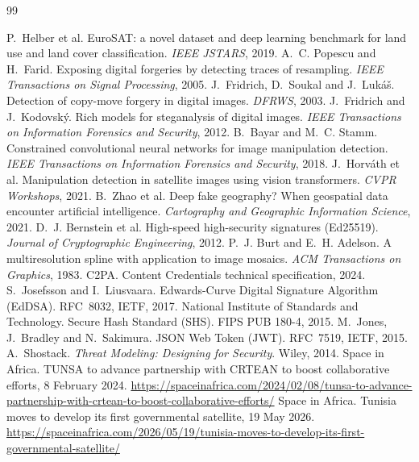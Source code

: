 \begin{thebibliography}{99}
 P.~Helber et al. EuroSAT: a novel dataset and deep learning benchmark for land use and land cover classification. \textit{IEEE JSTARS}, 2019.
 A.~C. Popescu and H.~Farid. Exposing digital forgeries by detecting traces of resampling. \textit{IEEE Transactions on Signal Processing}, 2005.
 J.~Fridrich, D.~Soukal and J.~Luk\'a\v{s}. Detection of copy-move forgery in digital images. \textit{DFRWS}, 2003.
 J.~Fridrich and J.~Kodovsk\'y. Rich models for steganalysis of digital images. \textit{IEEE Transactions on Information Forensics and Security}, 2012.
 B.~Bayar and M.~C. Stamm. Constrained convolutional neural networks for image manipulation detection. \textit{IEEE Transactions on Information Forensics and Security}, 2018.
 J.~Horv\'ath et al. Manipulation detection in satellite images using vision transformers. \textit{CVPR Workshops}, 2021.
 B.~Zhao et al. Deep fake geography? When geospatial data encounter artificial intelligence. \textit{Cartography and Geographic Information Science}, 2021.
 D.~J. Bernstein et al. High-speed high-security signatures (Ed25519). \textit{Journal of Cryptographic Engineering}, 2012.
 P.~J. Burt and E.~H. Adelson. A multiresolution spline with application to image mosaics. \textit{ACM Transactions on Graphics}, 1983.
 C2PA. Content Credentials technical specification, 2024.
 S.~Josefsson and I.~Liusvaara. Edwards-Curve Digital Signature Algorithm (EdDSA). RFC~8032, IETF, 2017.
 National Institute of Standards and Technology. Secure Hash Standard (SHS). FIPS PUB 180-4, 2015.
 M.~Jones, J.~Bradley and N.~Sakimura. JSON Web Token (JWT). RFC~7519, IETF, 2015.
 A.~Shostack. \textit{Threat Modeling: Designing for Security}. Wiley, 2014.
 Space in Africa. TUNSA to advance partnership with CRTEAN to boost collaborative efforts, 8 February 2024. \url{https://spaceinafrica.com/2024/02/08/tunsa-to-advance-partnership-with-crtean-to-boost-collaborative-efforts/}
 Space in Africa. Tunisia moves to develop its first governmental satellite, 19 May 2026. \url{https://spaceinafrica.com/2026/05/19/tunisia-moves-to-develop-its-first-governmental-satellite/}
\end{thebibliography}

